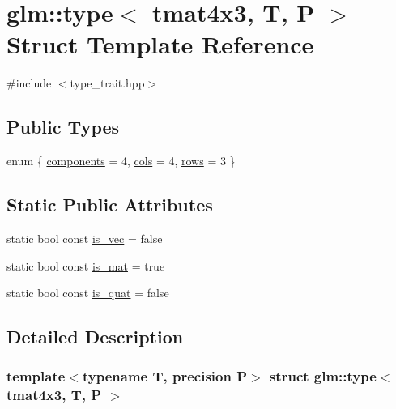 \hypertarget{structglm_1_1type_3_01tmat4x3_00_01_t_00_01_p_01_4}{}\section{glm\+::type$<$ tmat4x3, T, P $>$ Struct Template Reference}
\label{structglm_1_1type_3_01tmat4x3_00_01_t_00_01_p_01_4}


{\ttfamily \#include $<$type\+\_\+trait.\+hpp$>$}

\subsection*{Public Types}
\begin{DoxyCompactItemize}
\item 
enum \{ \mbox{\hyperlink{structglm_1_1type_3_01tmat4x3_00_01_t_00_01_p_01_4_a61e32c94b96d00d3a7a8a38af84d4fbda25294b860dbcde0cb7bb473a793f166c}{components}} = 4, 
\mbox{\hyperlink{structglm_1_1type_3_01tmat4x3_00_01_t_00_01_p_01_4_a61e32c94b96d00d3a7a8a38af84d4fbda7a2fc81578210cb3286a1a9c0763e1ab}{cols}} = 4, 
\mbox{\hyperlink{structglm_1_1type_3_01tmat4x3_00_01_t_00_01_p_01_4_a61e32c94b96d00d3a7a8a38af84d4fbda099a9e4ef8b8ed70519311eb33453554}{rows}} = 3
 \}
\end{DoxyCompactItemize}
\subsection*{Static Public Attributes}
\begin{DoxyCompactItemize}
\item 
static bool const \mbox{\hyperlink{structglm_1_1type_3_01tmat4x3_00_01_t_00_01_p_01_4_a8c22325c199636bab17e66d3e5572d8b}{is\+\_\+vec}} = false
\item 
static bool const \mbox{\hyperlink{structglm_1_1type_3_01tmat4x3_00_01_t_00_01_p_01_4_a1f5540d696a1308c534093c44c389f8a}{is\+\_\+mat}} = true
\item 
static bool const \mbox{\hyperlink{structglm_1_1type_3_01tmat4x3_00_01_t_00_01_p_01_4_a0c8a60f09e04cac5f9bd175708edb29e}{is\+\_\+quat}} = false
\end{DoxyCompactItemize}


\subsection{Detailed Description}
\subsubsection*{template$<$typename T, precision P$>$\newline
struct glm\+::type$<$ tmat4x3, T, P $>$}



